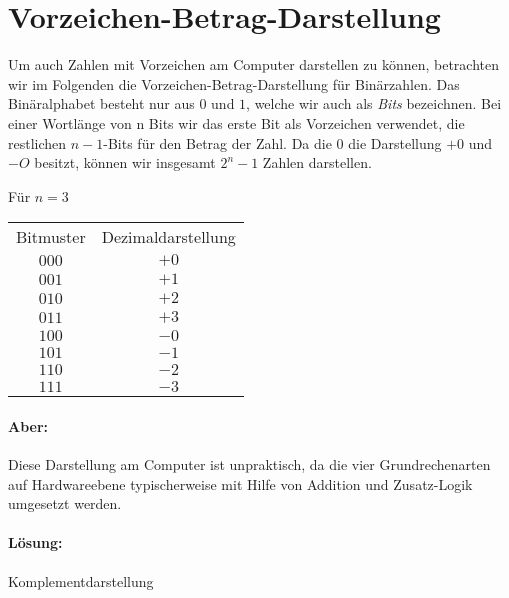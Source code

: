 \section{Vorzeichen-Betrag-Darstellung}
Um auch Zahlen mit Vorzeichen am Computer darstellen zu können, betrachten wir im Folgenden die Vorzeichen-Betrag-Darstellung für Binärzahlen.
Das Binäralphabet besteht nur aus $0$ und $1$, welche wir auch als \emph{Bits} bezeichnen.
Bei einer Wortlänge von n Bits wir das erste Bit als Vorzeichen verwendet, die restlichen $n-1$-Bits für den Betrag der Zahl. Da die 0 die Darstellung $+0$ und $-O$ besitzt, können wir insgesamt $2^{n}-1$ Zahlen darstellen.

\begin{example}
Für $n=3$\\

\begin{table}[htpb]
	\centering
	\begin{tabular}{c c}
		Bitmuster & Dezimaldarstellung \\
		$000$ & $+0$ \\
		$001$ & $+1$ \\
		$010$ & $+2$ \\
		$011$ & $+3$ \\
		$100$ & $-0$ \\
		$101$ & $-1$\\
		$110$ & $-2$\\
		$111$ & $-3$
	\end{tabular}
\end{table}
\end{example}

\paragraph{Aber:} Diese Darstellung am Computer ist unpraktisch, da die vier Grundrechenarten auf Hardwareebene typischerweise mit Hilfe von Addition und Zusatz-Logik umgesetzt werden.
\paragraph{Lösung:} Komplementdarstellung
